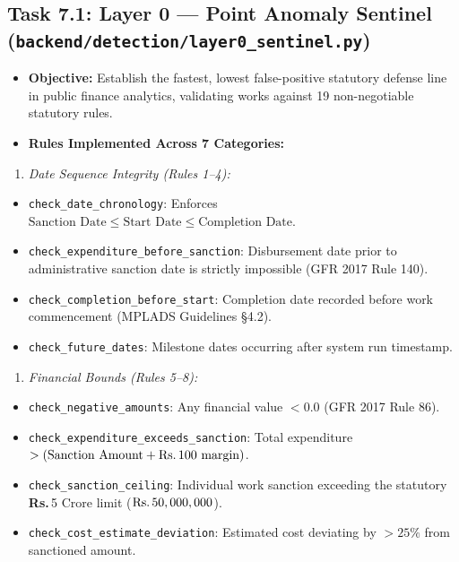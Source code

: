 \documentclass[11pt,a4paper]{article}
\DeclareRobustCommand{\INR}{\textbf{Rs.\,}}
\DeclareRobustCommand{\INR}{₹}
\begin{document}
\subsection{Task 7.1: Layer 0 --- Point Anomaly Sentinel (\texttt{backend/detection/layer0\_sentinel.py})}
\begin{itemize}[leftmargin=1.5em, itemsep=2pt, topsep=3pt]
\item \textbf{Objective:} Establish the fastest, lowest false-positive statutory defense line in public finance analytics, validating works against 19 non-negotiable statutory rules.
\item \textbf{Rules Implemented Across 7 Categories:}
\end{itemize}
\begin{enumerate}[leftmargin=1.5em, itemsep=2pt, topsep=3pt]
\item \textit{Date Sequence Integrity (Rules 1–4):}
\end{enumerate}
\begin{itemize}[leftmargin=1.5em, itemsep=2pt, topsep=3pt]
\item \texttt{check\_date\_chronology}: Enforces $\text{Sanction Date} \le \text{Start Date} \le \text{Completion Date}$.
\item \texttt{check\_expenditure\_before\_sanction}: Disbursement date prior to administrative sanction date is strictly impossible (GFR 2017 Rule 140).
\item \texttt{check\_completion\_before\_start}: Completion date recorded before work commencement (MPLADS Guidelines §4.2).
\item \texttt{check\_future\_dates}: Milestone dates occurring after system run timestamp.
\end{itemize}
\begin{enumerate}[leftmargin=1.5em, itemsep=2pt, topsep=3pt]
\item \textit{Financial Bounds (Rules 5–8):}
\end{enumerate}
\begin{itemize}[leftmargin=1.5em, itemsep=2pt, topsep=3pt]
\item \texttt{check\_negative\_amounts}: Any financial value $< 0.0$ (GFR 2017 Rule 86).
\item \texttt{check\_expenditure\_exceeds\_sanction}: Total expenditure $> (\text{Sanction Amount} + \text{Rs.\,}100 \text{ margin})$.
\item \texttt{check\_sanction\_ceiling}: Individual work sanction exceeding the statutory \INR{}5 Crore limit ($\text{Rs.\,}50,000,000$).
\item \texttt{check\_cost\_estimate\_deviation}: Estimated cost deviating by $> 25\%$ from sanctioned amount.
\end{itemize}
\end{document}
